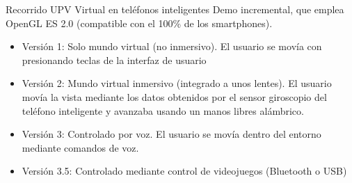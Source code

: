 
\begin{frame}{Recorrido UPV Virtual en teléfonos inteligentes}
Demo incremental, que emplea OpenGL ES 2.0 (compatible con el 100\% de los smartphones). 
\begin{itemize}
\item Versión 1: Solo mundo virtual (no inmersivo). El usuario se movía con presionando teclas de la interfaz de usuario
\item Versión 2: Mundo virtual inmersivo (integrado a unos lentes). El usuario movía la vista mediante los datos obtenidos por el sensor giroscopio del teléfono inteligente y avanzaba usando un manos libres alámbrico.
\item Versión 3: Controlado por voz. El usuario se movía dentro del entorno mediante comandos de voz.
\item Versión 3.5: Controlado mediante control de videojuegos (Bluetooth o USB)
\end{itemize}
\end{frame}

